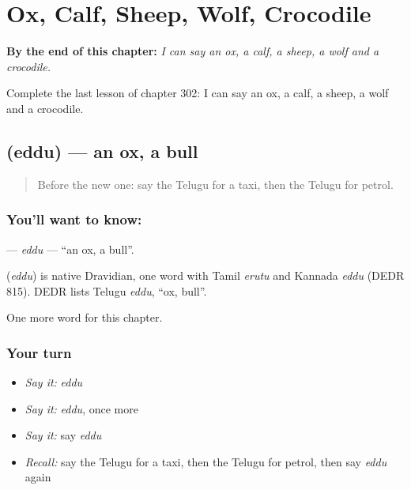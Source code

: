 
\chapter{Ox, Calf, Sheep, Wolf, Crocodile}
\label{ch:te-ox-calf-sheep-wolf-crocodile}

\begin{chapteropening}
\textbf{By the end of this chapter:} \emph{I can say an ox, a calf, a sheep, a wolf and a crocodile.}

Complete the last lesson of chapter 302: I can say an ox, a calf, a sheep, a wolf and a crocodile.
\end{chapteropening}

\section[\texorpdfstring{\te{ఎద్దు} (eddu)}{ఎద్దు (eddu)}]{ (eddu) — an ox, a bull}

\label{lesson:TE-C302-eddu}



\begin{quote}
Before the new one: say the Telugu for a taxi, then the Telugu for petrol.
\end{quote}

\subsection*{You'll want to know: }
\textbf{} — \emph{eddu} — \textquotedblleft{}an ox, a bull\textquotedblright{}.

\begin{cousinweb}
\textbf{} (\emph{eddu}) is native Dravidian, one word with Tamil \emph{erutu} and Kannada \emph{eddu} (DEDR 815). DEDR lists Telugu \emph{eddu}, \textquotedblleft{}ox, bull\textquotedblright{}.
\end{cousinweb}

\begin{grammarlens}[title={What you've built}]
One more word for this chapter.
\end{grammarlens}

\subsection*{Your turn}
\begin{itemize}
\raggedright
  \item \emph{Say it:} \emph{eddu}
  \item \emph{Say it:} \emph{eddu}, once more
  \item \emph{Say it:} say \emph{eddu}
  \item \emph{Recall:} say the Telugu for a taxi, then the Telugu for petrol, then say \emph{eddu} again
\end{itemize}

